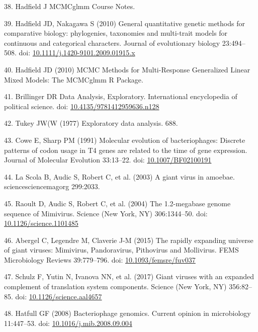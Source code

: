 \documentclass[12pt,twoside]{mitthesis-manusdown}
\begin{document}
\hypertarget{ref-Hadfield}{}
38. Hadfield J MCMCglmm Course Notes.

\hypertarget{ref-Hadfield2010a}{}
39. Hadfield JD, Nakagawa S (2010) General quantitative genetic methods
for comparative biology: phylogenies, taxonomies and multi-trait models
for continuous and categorical characters. Journal of evolutionary
biology 23:494--508. doi:
\href{https://doi.org/10.1111/j.1420-9101.2009.01915.x}{10.1111/j.1420-9101.2009.01915.x}

\hypertarget{ref-Hadfield2010}{}
40. Hadfield JD (2010) MCMC Methods for Multi-Response Generalized
Linear Mixed Models: The MCMCglmm R Package.

\hypertarget{ref-Brillinger}{}
41. Brillinger DR Data Analysis, Exploratory. International encyclopedia
of political science. doi:
\href{https://doi.org/10.4135/9781412959636.n128}{10.4135/9781412959636.n128}

\hypertarget{ref-Tukey1977}{}
42. Tukey JW(W (1977) Exploratory data analysis. 688.

\hypertarget{ref-Cowe1991}{}
43. Cowe E, Sharp PM (1991) Molecular evolution of bacteriophages:
Discrete patterns of codon usage in T4 genes are related to the time of
gene expression. Journal of Molecular Evolution 33:13--22. doi:
\href{https://doi.org/10.1007/BF02100191}{10.1007/BF02100191}

\hypertarget{ref-Scola}{}
44. La Scola B, Audic S, Robert C, et al. (2003) A giant virus in
amoebae. sciencesciencemagorg 299:2033.

\hypertarget{ref-Raoult2004}{}
45. Raoult D, Audic S, Robert C, et al. (2004) The 1.2-megabase genome
sequence of Mimivirus. Science (New York, NY) 306:1344--50. doi:
\href{https://doi.org/10.1126/science.1101485}{10.1126/science.1101485}

\hypertarget{ref-Abergel2015}{}
46. Abergel C, Legendre M, Claverie J-M (2015) The rapidly expanding
universe of giant viruses: Mimivirus, Pandoravirus, Pithovirus and
Mollivirus. FEMS Microbiology Reviews 39:779--796. doi:
\href{https://doi.org/10.1093/femsre/fuv037}{10.1093/femsre/fuv037}

\hypertarget{ref-Schulz2017}{}
47. Schulz F, Yutin N, Ivanova NN, et al. (2017) Giant viruses with an
expanded complement of translation system components. Science (New York,
NY) 356:82--85. doi:
\href{https://doi.org/10.1126/science.aal4657}{10.1126/science.aal4657}

\hypertarget{ref-Hatfull2008}{}
48. Hatfull GF (2008) Bacteriophage genomics. Current opinion in
microbiology 11:447--53. doi:
\href{https://doi.org/10.1016/j.mib.2008.09.004}{10.1016/j.mib.2008.09.004}
\end{document}
